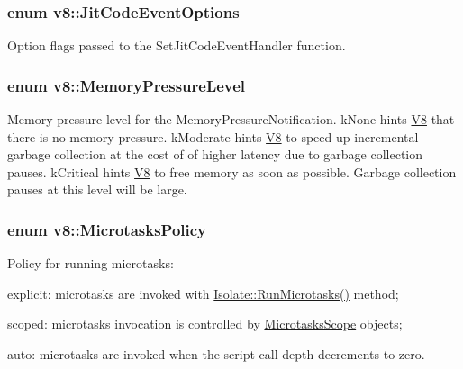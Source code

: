 \subsubsection[{\texorpdfstring{Jit\+Code\+Event\+Options}{JitCodeEventOptions}}]{\setlength{\rightskip}{0pt plus 5cm}enum {\bf v8\+::\+Jit\+Code\+Event\+Options}}\hypertarget{namespacev8_a06f34fa4fa4cfc8518366808d1d461c1}{}\label{namespacev8_a06f34fa4fa4cfc8518366808d1d461c1}
Option flags passed to the Set\+Jit\+Code\+Event\+Handler function. 
\subsubsection[{\texorpdfstring{Memory\+Pressure\+Level}{MemoryPressureLevel}}]{\setlength{\rightskip}{0pt plus 5cm}enum {\bf v8\+::\+Memory\+Pressure\+Level}\hspace{0.3cm}{\ttfamily [strong]}}\hypertarget{namespacev8_ae0e9a25bf51e518585f555806e7dc7b9}{}\label{namespacev8_ae0e9a25bf51e518585f555806e7dc7b9}
Memory pressure level for the Memory\+Pressure\+Notification. k\+None hints \hyperlink{classv8_1_1_v8}{V8} that there is no memory pressure. k\+Moderate hints \hyperlink{classv8_1_1_v8}{V8} to speed up incremental garbage collection at the cost of of higher latency due to garbage collection pauses. k\+Critical hints \hyperlink{classv8_1_1_v8}{V8} to free memory as soon as possible. Garbage collection pauses at this level will be large. 
\subsubsection[{\texorpdfstring{Microtasks\+Policy}{MicrotasksPolicy}}]{\setlength{\rightskip}{0pt plus 5cm}enum {\bf v8\+::\+Microtasks\+Policy}\hspace{0.3cm}{\ttfamily [strong]}}\hypertarget{namespacev8_a2f183b102b3d1b7a30a805e8c53c04da}{}\label{namespacev8_a2f183b102b3d1b7a30a805e8c53c04da}
Policy for running microtasks\+:
\begin{DoxyItemize}
\item explicit\+: microtasks are invoked with \hyperlink{classv8_1_1_isolate_ac3cbe2a1632eb863912640dcfc98b6c8}{Isolate\+::\+Run\+Microtasks()} method;
\item scoped\+: microtasks invocation is controlled by \hyperlink{classv8_1_1_microtasks_scope}{Microtasks\+Scope} objects;
\item auto\+: microtasks are invoked when the script call depth decrements to zero. 
\end{DoxyItemize}
